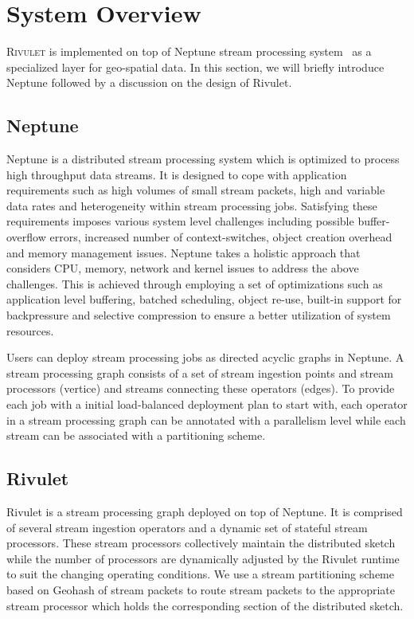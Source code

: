 \section{System Overview}
\label{sec:system}
\textsc{Rivulet} is implemented on top of Neptune stream processing system~\cite{buddhika2016neptune} as a specialized layer for geo-spatial data.
In this section, we will briefly introduce Neptune followed by a discussion on the design of Rivulet.

\subsection{Neptune}
Neptune is a distributed stream processing system which is optimized to process high throughput data streams.
It is designed to cope with application requirements such as high volumes of small stream packets, high and variable data rates and heterogeneity within stream processing jobs.
Satisfying these requirements imposes various system level challenges including possible buffer-overflow errors, increased number of context-switches, object creation overhead and memory management issues.
Neptune takes a holistic approach that considers CPU, memory, network and kernel issues to address the above challenges.
This is achieved through employing a set of optimizations such as application level buffering, batched scheduling, object re-use, built-in support for backpressure and selective compression to ensure a better utilization of system resources.

Users can deploy stream processing jobs as directed acyclic graphs in Neptune.
A stream processing graph consists of a set of stream ingestion points and stream processors (vertice) and streams connecting these operators (edges).
To provide each job with a initial load-balanced deployment plan to start with, each operator in a stream processing graph can be annotated with a parallelism level while each stream can be associated with a partitioning scheme.

\subsection{Rivulet}
Rivulet is a stream processing graph deployed on top of Neptune.
It is comprised of several stream ingestion operators and a dynamic set of stateful stream processors.
These stream processors collectively maintain the distributed sketch while the number of processors are dynamically adjusted by the Rivulet runtime to suit the changing operating conditions.
We use a stream partitioning scheme based on Geohash of stream packets to route stream packets to the appropriate stream processor which holds the corresponding section of the distributed sketch.

